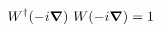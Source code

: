 \begin{equation}
W^{\dag} (-i \mbox{\boldmath $\nabla$}) ~ W (-i \mbox{\boldmath $\nabla$}) = 1
\end{equation}

